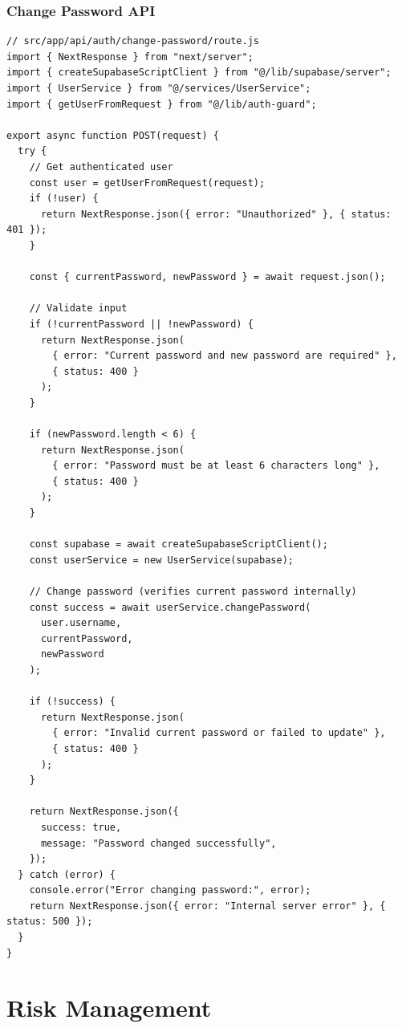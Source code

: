 \documentclass[12pt,a4paper]{article}
\begin{document}
\subsubsection{Change Password API}

\begin{verbatim}
// src/app/api/auth/change-password/route.js
import { NextResponse } from "next/server";
import { createSupabaseScriptClient } from "@/lib/supabase/server";
import { UserService } from "@/services/UserService";
import { getUserFromRequest } from "@/lib/auth-guard";

export async function POST(request) {
  try {
    // Get authenticated user
    const user = getUserFromRequest(request);
    if (!user) {
      return NextResponse.json({ error: "Unauthorized" }, { status: 401 });
    }

    const { currentPassword, newPassword } = await request.json();

    // Validate input
    if (!currentPassword || !newPassword) {
      return NextResponse.json(
        { error: "Current password and new password are required" },
        { status: 400 }
      );
    }

    if (newPassword.length < 6) {
      return NextResponse.json(
        { error: "Password must be at least 6 characters long" },
        { status: 400 }
      );
    }

    const supabase = await createSupabaseScriptClient();
    const userService = new UserService(supabase);

    // Change password (verifies current password internally)
    const success = await userService.changePassword(
      user.username,
      currentPassword,
      newPassword
    );

    if (!success) {
      return NextResponse.json(
        { error: "Invalid current password or failed to update" },
        { status: 400 }
      );
    }

    return NextResponse.json({
      success: true,
      message: "Password changed successfully",
    });
  } catch (error) {
    console.error("Error changing password:", error);
    return NextResponse.json({ error: "Internal server error" }, { status: 500 });
  }
}
\end{verbatim}

\section{Risk Management}
\end{document}

